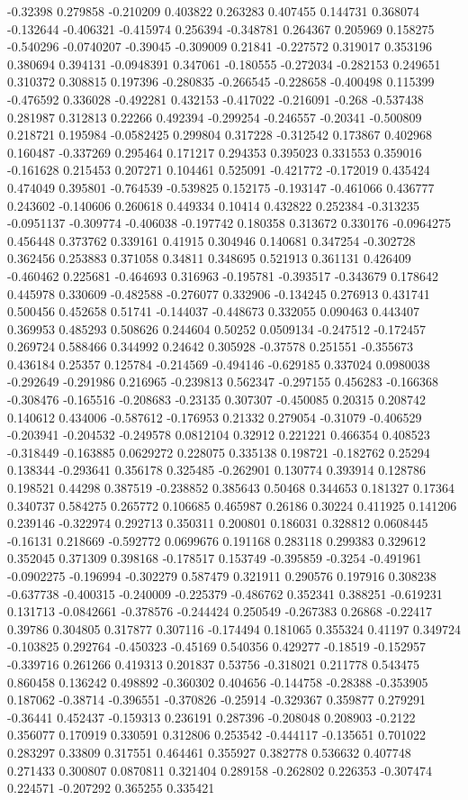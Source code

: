-0.32398 0.279858 -0.210209 0.403822 0.263283 0.407455 0.144731 0.368074 -0.132644 -0.406321 -0.415974 0.256394 -0.348781 0.264367 0.205969 0.158275 -0.540296 -0.0740207 -0.39045 -0.309009 0.21841 -0.227572 0.319017 0.353196 0.380694 0.394131 -0.0948391 0.347061 -0.180555 -0.272034 -0.282153 0.249651 0.310372 0.308815 0.197396 -0.280835 -0.266545 -0.228658 -0.400498 0.115399 -0.476592 0.336028 -0.492281 0.432153 -0.417022 -0.216091 -0.268 -0.537438 0.281987 0.312813 0.22266 0.492394 -0.299254 -0.246557 -0.20341 -0.500809 0.218721 0.195984 -0.0582425 0.299804 0.317228 -0.312542 0.173867 0.402968 0.160487 -0.337269 0.295464 0.171217 0.294353 0.395023 0.331553 0.359016 -0.161628 0.215453 0.207271 0.104461 0.525091 -0.421772 -0.172019 0.435424 0.474049 0.395801 -0.764539 -0.539825 0.152175 -0.193147 -0.461066 0.436777 0.243602 -0.140606 0.260618 0.449334 0.10414 0.432822 0.252384 -0.313235 -0.0951137 -0.309774 -0.406038 -0.197742 0.180358 0.313672 0.330176 -0.0964275 0.456448 0.373762 0.339161 0.41915 0.304946 0.140681 0.347254 -0.302728 0.362456 0.253883 0.371058 0.34811 0.348695 0.521913 0.361131 0.426409 -0.460462 0.225681 -0.464693 0.316963 -0.195781 -0.393517 -0.343679 0.178642 0.445978 0.330609 -0.482588 -0.276077 0.332906 -0.134245 0.276913 0.431741 0.500456 0.452658 0.51741 -0.144037 -0.448673 0.332055 0.090463 0.443407 0.369953 0.485293 0.508626 0.244604 0.50252 0.0509134 -0.247512 -0.172457 0.269724 0.588466 0.344992 0.24642 0.305928 -0.37578 0.251551 -0.355673 0.436184 0.25357 0.125784 -0.214569 -0.494146 -0.629185 0.337024 0.0980038 -0.292649 -0.291986 0.216965 -0.239813 0.562347 -0.297155 0.456283 -0.166368 -0.308476 -0.165516 -0.208683 -0.23135 0.307307 -0.450085 0.20315 0.208742 0.140612 0.434006 -0.587612 -0.176953 0.21332 0.279054 -0.31079 -0.406529 -0.203941 -0.204532 -0.249578 0.0812104 0.32912 0.221221 0.466354 0.408523 -0.318449 -0.163885 0.0629272 0.228075 0.335138 0.198721 -0.182762 0.25294 0.138344 -0.293641 0.356178 0.325485 -0.262901 0.130774 0.393914 0.128786 0.198521 0.44298 0.387519 -0.238852 0.385643 0.50468 0.344653 0.181327 0.17364 0.340737 0.584275 0.265772 0.106685 0.465987 0.26186 0.30224 0.411925 0.141206 0.239146 -0.322974 0.292713 0.350311 0.200801 0.186031 0.328812 0.0608445 -0.16131 0.218669 -0.592772 0.0699676 0.191168 0.283118 0.299383 0.329612 0.352045 0.371309 0.398168 -0.178517 0.153749 -0.395859 -0.3254 -0.491961 -0.0902275 -0.196994 -0.302279 0.587479 0.321911 0.290576 0.197916 0.308238 -0.637738 -0.400315 -0.240009 -0.225379 -0.486762 0.352341 0.388251 -0.619231 0.131713 -0.0842661 -0.378576 -0.244424 0.250549 -0.267383 0.26868 -0.22417 0.39786 0.304805 0.317877 0.307116 -0.174494 0.181065 0.355324 0.41197 0.349724 -0.103825 0.292764 -0.450323 -0.45169 0.540356 0.429277 -0.18519 -0.152957 -0.339716 0.261266 0.419313 0.201837 0.53756 -0.318021 0.211778 0.543475 0.860458 0.136242 0.498892 -0.360302 0.404656 -0.144758 -0.28388 -0.353905 0.187062 -0.38714 -0.396551 -0.370826 -0.25914 -0.329367 0.359877 0.279291 -0.36441 0.452437 -0.159313 0.236191 0.287396 -0.208048 0.208903 -0.2122 0.356077 0.170919 0.330591 0.312806 0.253542 -0.444117 -0.135651 0.701022 0.283297 0.33809 0.317551 0.464461 0.355927 0.382778 0.536632 0.407748 0.271433 0.300807 0.0870811 0.321404 0.289158 -0.262802 0.226353 -0.307474 0.224571 -0.207292 0.365255 0.335421 
